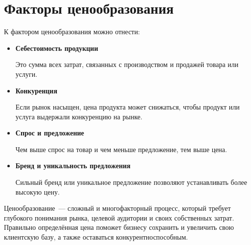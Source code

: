 \section{Факторы ценообразования}
К фактором ценообразования можно отнести:
\begin{itemize}
	\item \textbf{Себестоимость продукции}
	
	Это сумма всех затрат, связанных с производством и продажей товара или услуги.
	
	\item \textbf{Конкуренция}
	
	Если рынок насыщен, цена продукта может снижаться, чтобы продукт или услуга выдержали конкуренцию на рынке.
	
	\item\textbf{Спрос и предложение}
	
	Чем выше спрос на товар и чем меньше предложение, тем выше цена.
	
	\item\textbf{Бренд и уникальность предложения}
	
	Сильный бренд или уникальное предложение позволяют устанавливать более высокую цену.
\end{itemize}
		
Ценообразование~--- сложный и многофакторный процесс, который требует глубокого понимания рынка, целевой аудитории и своих собственных затрат. 
Правильно определённая цена поможет бизнесу сохранить и увеличить свою клиентскую базу, а также оставаться конкурентноспособным.
		
		
